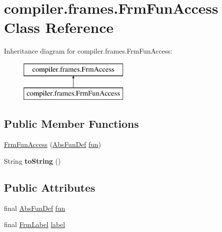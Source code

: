 \hypertarget{classcompiler_1_1frames_1_1_frm_fun_access}{}\section{compiler.\+frames.\+Frm\+Fun\+Access Class Reference}
\label{classcompiler_1_1frames_1_1_frm_fun_access}
Inheritance diagram for compiler.\+frames.\+Frm\+Fun\+Access\+:\begin{figure}[H]
\begin{center}
\leavevmode
\includegraphics[height=2.000000cm]{classcompiler_1_1frames_1_1_frm_fun_access}
\end{center}
\end{figure}
\subsection*{Public Member Functions}
\begin{DoxyCompactItemize}
\item 
\hyperlink{classcompiler_1_1frames_1_1_frm_fun_access_a741f17a16beb71bae8bc89cd15bf8ea4}{Frm\+Fun\+Access} (\hyperlink{classcompiler_1_1abstr_1_1tree_1_1def_1_1_abs_fun_def}{Abs\+Fun\+Def} \hyperlink{classcompiler_1_1frames_1_1_frm_fun_access_af2723e31d9937f6afd8b1ae64e54c0a3}{fun})
\item 
\mbox{\label{classcompiler_1_1frames_1_1_frm_fun_access_a07e059c7b1c296a8f147017eed419874}} 
String {\bfseries to\+String} ()
\end{DoxyCompactItemize}
\subsection*{Public Attributes}
\begin{DoxyCompactItemize}
\item 
final \hyperlink{classcompiler_1_1abstr_1_1tree_1_1def_1_1_abs_fun_def}{Abs\+Fun\+Def} \hyperlink{classcompiler_1_1frames_1_1_frm_fun_access_af2723e31d9937f6afd8b1ae64e54c0a3}{fun}
\item 
final \hyperlink{classcompiler_1_1frames_1_1_frm_label}{Frm\+Label} \hyperlink{classcompiler_1_1frames_1_1_frm_fun_access_a975ff47eb1fc06f534edf4990beb88c3}{label}
\end{DoxyCompactItemize}


